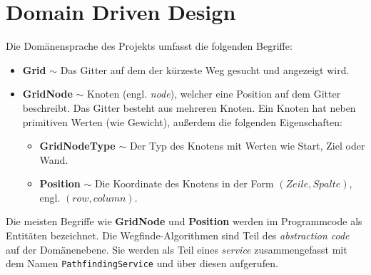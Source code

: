 \part{Domain Driven Design}
Die Domänensprache des Projekts umfasst die folgenden Begriffe:
\begin{itemize}
  \item \textbf{Grid} $\sim$ Das Gitter auf dem der kürzeste Weg gesucht und
        angezeigt wird.
  \item \textbf{GridNode} $\sim$ Knoten (engl. \textit{node}),
        welcher eine Position auf dem Gitter beschreibt. Das
        Gitter besteht aus mehreren Knoten. Ein Knoten hat neben
        primitiven Werten (wie Gewicht), außerdem die
        folgenden Eigenschaften:
        \begin{itemize}[topsep=0pt]
          \item \textbf{GridNodeType} $\sim$ Der Typ des Knotens mit Werten
                wie Start, Ziel oder Wand.
          \item \textbf{Position} $\sim$ Die Koordinate des Knotens in der
                Form $(Zeile,Spalte)$, engl. $(row,column)$.
        \end{itemize}
\end{itemize}
Die meisten Begriffe wie \textbf{GridNode} und \textbf{Position}
werden im Programmcode als Entitäten bezeichnet. Die
Wegfinde-Algorithmen sind Teil des \textit{abstraction code} auf
der Domänenebene. Sie werden als Teil eines \textit{service}
zusammengefasst mit dem Namen \texttt{Path\-findingService} und
über diesen aufgerufen.